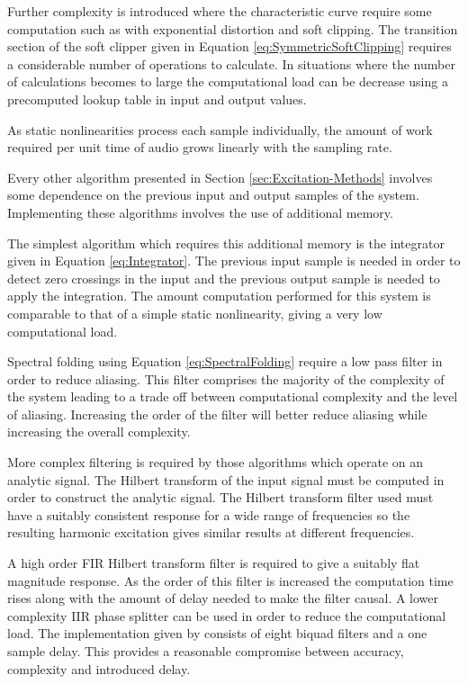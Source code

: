 		Further complexity is introduced where the characteristic curve require some computation such as with
		exponential distortion and soft clipping. The transition section of the soft clipper given in Equation
		\ref{eq:SymmetricSoftClipping} requires a considerable number of operations to calculate. In situations
		where the number of calculations becomes to large the computational load can be decrease using a
		precomputed lookup table in input and output values.

		As static nonlinearities process each sample individually, the amount of work required per unit time of
		audio grows linearly with the sampling rate.

		Every other algorithm presented in Section \ref{sec:Excitation-Methods} involves some dependence on the
		previous input and output samples of the system. Implementing these algorithms involves the use of
		additional memory.

		The simplest algorithm which requires this additional memory is the integrator given in Equation
		\ref{eq:Integrator}. The previous input sample is needed in order to detect zero crossings in the input and
		the previous output sample is needed to apply the integration. The amount computation performed for this
		system is comparable to that of a simple static nonlinearity, giving a very low computational load.

		Spectral folding using Equation \ref{eq:SpectralFolding} require a low pass filter in order to reduce
		aliasing. This filter comprises the majority of the complexity of the system leading to a trade off between
		computational complexity and the level of aliasing. Increasing the order of the filter will better reduce
		aliasing while increasing the overall complexity.

		More complex filtering is required by those algorithms which operate on an analytic signal. The Hilbert
		transform of the input signal must be computed in order to construct the analytic signal. The Hilbert
		transform filter used must have a suitably consistent response for a wide range of frequencies so the
		resulting harmonic excitation gives similar results at different frequencies.

		A high order FIR Hilbert transform filter is required to give a suitably flat magnitude response. As the
		order of this filter is increased the computation time rises along with the amount of delay needed to make
		the filter causal. A lower complexity IIR phase splitter can be used in order to reduce the computational
		load. The implementation given by \citet{niemitalo2003hilbert} consists of eight biquad filters and a one
		sample delay. This provides a reasonable compromise between accuracy, complexity and introduced delay.


